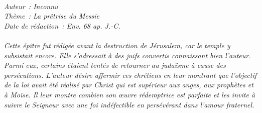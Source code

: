 \BFont
\noindent\hrulefill
{\footnotesize
\textit{
\bigskip
{\centering{}
\\Auteur~: Inconnu
\\Thème~: La prêtrise du Messie
\\Date de rédaction~: Env. 68 ap. J.-C.\\}
}
\textit{
\\Cette épître fut rédigée avant la destruction de Jérusalem, car le temple y subsistait encore. Elle s'adressait à des juifs convertis connaissant bien l'auteur. Parmi eux, certains étaient tentés de retourner au judaïsme à cause des persécutions. L'auteur désire affermir ces chrétiens en leur montrant que l'objectif de la loi avait été réalisé par Christ qui est supérieur aux anges, aux prophètes et à Moïse. Il leur montre combien son œuvre rédemptrice est parfaite et les invite à suivre le Seigneur avec une foi indéfectible en persévérant dans l'amour fraternel.\bigskip
}
}
\par\nobreak\noindent\hrulefill
